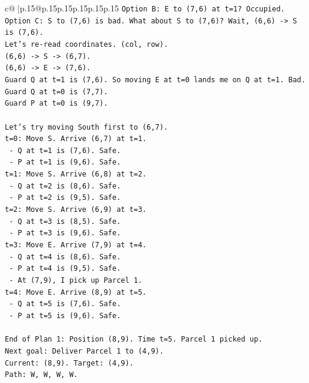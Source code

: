 \documentclass{article}
\begin{document}
{\begin{supertabular}{c@{$\;$}|p{.15\linewidth}@{}p{.15\linewidth}p{.15\linewidth}p{.15\linewidth}p{.15\linewidth}p{.15\linewidth}}
{{{\texttt{Option B: E to (7,6) at t=1? Occupied.} \\
\texttt{Option C: S to (7,6) is bad. What about S to (7,6)? Wait, (6,6) {-}> S is (7,6).} \\
\texttt{Let's re{-}read coordinates. (col, row).} \\
\texttt{(6,6) {-}> S {-}> (6,7).} \\
\texttt{(6,6) {-}> E {-}> (7,6).} \\
\texttt{Guard Q at t=1 is (7,6). So moving E at t=0 lands me on Q at t=1. Bad.} \\
\texttt{Guard Q at t=0 is (7,7).} \\
\texttt{Guard P at t=0 is (9,7).} \\
\\ 
\texttt{Let's try moving South first to (6,7).} \\
\texttt{t=0: Move S. Arrive (6,7) at t=1.} \\
\texttt{  {-} Q at t=1 is (7,6). Safe.} \\
\texttt{  {-} P at t=1 is (9,6). Safe.} \\
\texttt{t=1: Move S. Arrive (6,8) at t=2.} \\
\texttt{  {-} Q at t=2 is (8,6). Safe.} \\
\texttt{  {-} P at t=2 is (9,5). Safe.} \\
\texttt{t=2: Move S. Arrive (6,9) at t=3.} \\
\texttt{  {-} Q at t=3 is (8,5). Safe.} \\
\texttt{  {-} P at t=3 is (9,6). Safe.} \\
\texttt{t=3: Move E. Arrive (7,9) at t=4.} \\
\texttt{  {-} Q at t=4 is (8,6). Safe.} \\
\texttt{  {-} P at t=4 is (9,5). Safe.} \\
\texttt{  {-} At (7,9), I pick up Parcel 1.} \\
\texttt{t=4: Move E. Arrive (8,9) at t=5.} \\
\texttt{  {-} Q at t=5 is (7,6). Safe.} \\
\texttt{  {-} P at t=5 is (9,6). Safe.} \\
\\ 
\texttt{End of Plan 1: Position (8,9). Time t=5. Parcel 1 picked up.} \\
\texttt{Next goal: Deliver Parcel 1 to (4,9).} \\
\texttt{Current: (8,9). Target: (4,9).} \\
\texttt{Path: W, W, W, W.} \\
}}}
\end{supertabular}}
\end{document}
